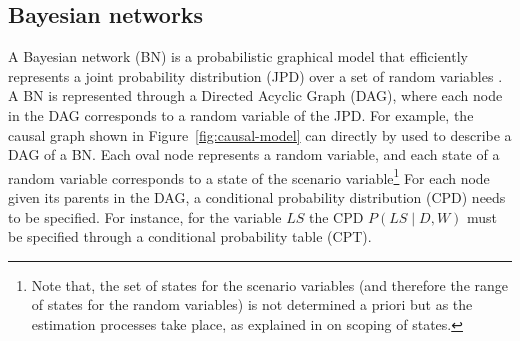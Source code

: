 \documentclass[conference]{IEEEtran}
\begin{document}
\subsection{Bayesian networks}\label{sub:bayesian-networks}


A Bayesian network (BN) is a probabilistic graphical model that efficiently represents a joint probability distribution (JPD) over a set of random variables \cite{jensen01book,pearl88book}. A BN is represented through a Directed Acyclic Graph (DAG), where each node in the DAG corresponds to a random variable of the JPD. For example, the causal graph shown in Figure~\ref{fig:causal-model} can directly by used to describe a DAG of a BN. Each oval node represents a random variable, and each state of a random variable corresponds to a state of the scenario variable\footnote{Note that, the set of states for the scenario variables (and therefore the range of states for the random variables) is not determined a priori but as the estimation processes take place, as explained in \cite{conrado14if} on scoping of states.}
For each node given its parents in the DAG, a conditional probability distribution (CPD) needs to be specified. For instance, for the variable $LS$ the CPD $P(LS\mid D,W)$ must be specified through a conditional probability table (CPT). 

\end{document}

